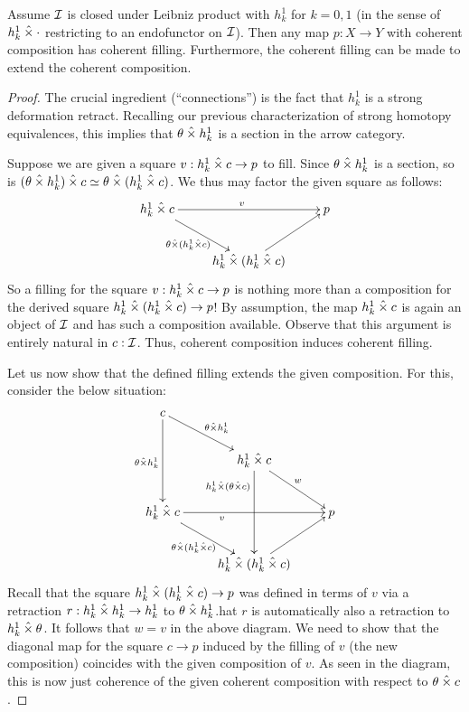 \documentclass[reqno,10pt,a4paper,oneside]{amsart}
\begin{document}
\begin{lemma}
Assume $\cal{I}$ is closed under Leibniz product with $h_k^1$ for $k = 0, 1$ (in the sense of $h_k^1 \hattimes \arghole$ restricting to an endofunctor on $\cal{I}$).
Then any map $p : X \to Y$ with coherent composition has coherent filling.
Furthermore, the coherent filling can be made to extend the coherent composition.
\end{lemma}

\begin{proof}
The crucial ingredient (``connections'') is the fact that $h_k^1$ is a strong deformation retract.
Recalling our previous characterization of strong homotopy equivalences, this implies that $\theta \hattimes h_k^1$ is a section in the arrow category.

Suppose we are given a square $v : h_k^1 \hattimes c \to p$ to fill.
Since $\theta \hattimes h_k^1$ is a section, so is $(\theta \hattimes h_k^1) \hattimes c \simeq \theta \hattimes (h_k^1 \hattimes c)$.
We thus may factor the given square as follows:
\[
\xymatrix{
  h_k^1 \hattimes c
  \ar[rr]^{v}
  \ar[dr]_{\theta \hattimes (h_k^1 \hattimes c)}
&&
  p
\\&
  h_k^1 \hattimes (h_k^1 \hattimes c)
  \ar[ur]
}
\]
So a filling for the square $v : h_k^1 \hattimes c \to p$ is nothing more than a composition for the derived square $h_k^1 \hattimes (h_k^1 \hattimes c) \to p$!
By assumption, the map $h_k^1 \hattimes c$ is again an object of $\cal{I}$ and has such a composition available.
Observe that this argument is entirely natural in $c : \cal{I}$.
Thus, coherent composition induces coherent filling.

Let us now show that the defined filling extends the given composition.
For this, consider the below situation:
\[
\xymatrix{
  c
  \ar[dr]^{\theta \hattimes h_k^1}
  \ar[dd]_{\theta \hattimes h_k^1}
\\&
  h_k^1 \hattimes c
  \ar[dd]_(0.25){h_k^1 \hattimes (\theta \hattimes c)}
  \ar[dr]^{w}
\\
  h_k^1 \hattimes c
  \ar[rr]_(0.35){v}
  \ar[dr]_{\theta \hattimes (h_k^1 \hattimes c)}
&&
  p
\\&
  h_k^1 \hattimes (h_k^1 \hattimes c)
  \ar[ur]
}
\]
Recall that the square $h_k^1 \hattimes (h_k^1 \hattimes c) \to p$ was defined in terms of $v$ via a retraction $r : h_k^1 \hattimes h_k^1 \to h_k^1$ to $\theta \hattimes h_k^1$.hat $r$ is automatically also a retraction to $h_k^1 \hattimes \theta$.
It follows that $w = v$ in the above diagram.
We need to show that the diagonal map for the square $c \to p$ induced by the filling of $v$ (the new composition) coincides with the given composition of $v$.
As seen in the diagram, this is now just coherence of the given coherent composition with respect to $\theta \hattimes c$.
\end{proof}
\end{document}
